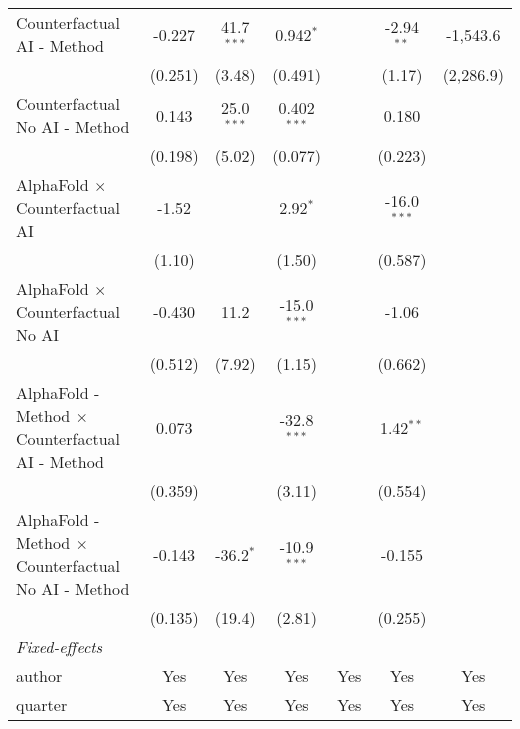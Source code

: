 \begin{tabular}{lcccccc}
   Counterfactual AI - Method                                 & -0.227      & 41.7$^{***}$ & 0.942$^{*}$   &       & -2.94$^{**}$  & -1,543.6\\   
                                                              & (0.251)     & (3.48)       & (0.491)       &       & (1.17)        & (2,286.9)\\   
   Counterfactual No AI - Method                              & 0.143       & 25.0$^{***}$ & 0.402$^{***}$ &       & 0.180         &   \\   
                                                              & (0.198)     & (5.02)       & (0.077)       &       & (0.223)       &   \\   
   AlphaFold $\times$ Counterfactual AI                       & -1.52       &              & 2.92$^{*}$    &       & -16.0$^{***}$ &   \\   
                                                              & (1.10)      &              & (1.50)        &       & (0.587)       &   \\   
   AlphaFold $\times$ Counterfactual No AI                    & -0.430      & 11.2         & -15.0$^{***}$ &       & -1.06         &   \\   
                                                              & (0.512)     & (7.92)       & (1.15)        &       & (0.662)       &   \\   
   AlphaFold - Method $\times$ Counterfactual AI - Method     & 0.073       &              & -32.8$^{***}$ &       & 1.42$^{**}$   &   \\   
                                                              & (0.359)     &              & (3.11)        &       & (0.554)       &   \\   
   AlphaFold - Method $\times$ Counterfactual No AI - Method  & -0.143      & -36.2$^{*}$  & -10.9$^{***}$ &       & -0.155        &   \\   
                                                              & (0.135)     & (19.4)       & (2.81)        &       & (0.255)       &   \\   
   \midrule
   \emph{Fixed-effects}\\
   author                                                     & Yes         & Yes          & Yes           & Yes   & Yes           & Yes\\  
   quarter                                                    & Yes         & Yes          & Yes           & Yes   & Yes           & Yes\\  

\end{tabular}
